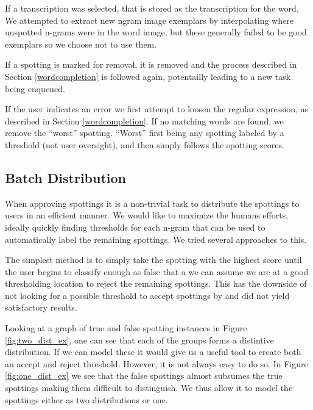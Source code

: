 \documentclass[ms,electronic,twosidetoc,letterpaper,chaptercenter,parttop,lof,lot]{byumsphd}
\begin{document}
If a transcription was selected, that is stored as the transcription for the word. We attempted to extract new ngram image exemplars by interpolating where unspotted n-grams were in the word image, but these generally failed to be good exemplars so we choose not to use them.

If a spotting is marked for removal, it is removed and the process described in Section \ref{wordcompletion} is followed again, potentailly leading to a new task being enqueued.

If the user indicates an error we first attempt to loosen the regular expression, as described in Section \ref{wordcompletion}. If no matching words are found, we remove the ``worst'' spotting. ``Worst'' first being any spotting labeled by a threshold (not user oversight), and then simply follows the spotting scores.


\subsection{Batch Distribution}
When approving spottings it is a non-trivial task to distribute the spottings to users in an efficient manner. We would like to maximize the humans efforts, ideally quickly finding thresholds for each n-gram that can be used to automatically label the remaining spottings. We tried several approaches to this.

The simplest method is to simply take the spotting with the highest score until the user begins to classify enough as false that  a we can assume we are at a good thresholding location to reject the remaining spottings. 
This has the downside of not looking for a possible threshold to accept spottings by and did not yield satisfactory results.




Looking at a graph of true and false spotting instances in Figure \ref{fig:two_dist_ex}, one can see that each of the groups forms a distintive distribution. If we can model these it would give us a useful tool to create both an accept and reject threshold. However, it is not always easy to do so. In Figure \ref{fig:one_dist_ex} we see that the false spottings almost subsumes the true spottings making them difficult to distinguish. We thus allow it to model the spottings either as two distributions or one.
\end{document}
